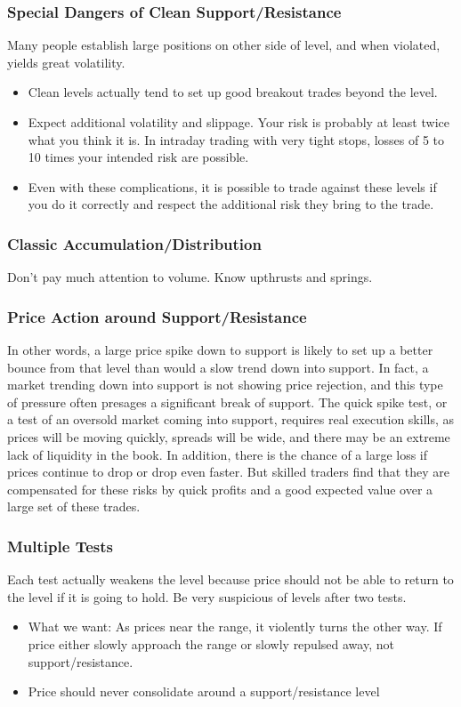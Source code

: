 \documentclass{../notes}
\begin{document}
\subsubsection{Special Dangers of Clean Support/Resistance}
Many people establish large positions on other side of level, and when violated, yields great volatility.
\begin{itemize}
  \item Clean levels actually tend to set up good breakout trades beyond the level.
  \item Expect additional volatility and slippage. Your risk is probably at least twice what you think it is. In intraday trading with very tight stops, losses of 5 to 10 times your intended risk are possible.
  \item Even with these complications, it is possible to trade against these levels if you do it correctly and respect the additional risk they bring to the trade.
\end{itemize}
\subsubsection{Classic Accumulation/Distribution}
Don't pay much attention to volume. Know upthrusts and springs.

\subsubsection{Price Action around Support/Resistance}
 In other words, a large price spike down to support is likely to set up a better bounce from that level than would a slow trend down into support. In fact, a market trending down into support is not showing price rejection, and this type of pressure often presages a significant break of support. The quick spike test, or a test of an oversold market coming into support, requires real execution skills, as prices will be moving quickly, spreads will be wide, and there may be an extreme lack of liquidity in the book. In addition, there is the chance of a large loss if prices continue to drop or drop even faster. But skilled traders find that they are compensated for these risks by quick profits and a good expected value over a large set of these trades.
\subsubsection{Multiple Tests}
Each test actually weakens the level because price should not be able to return to the level if it is going to hold. Be very suspicious of levels after two tests.
\begin{itemize}
  \item What we want: As prices near the range, it violently turns the other way. If price either slowly approach the range or slowly repulsed away, not support/resistance.
  \item Price should never consolidate around a support/resistance level
\end{itemize}
\end{document}
